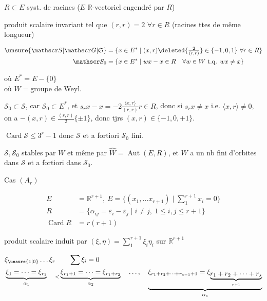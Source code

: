 
$R\subset E$ syst. de racines ($E$ $\mathbb R$-vectoriel engendré par $R$)

produit scalaire invariant tel que $(r,r)=2$ $\forall r\in R$ (racines ttes de même longueur)

\[
\begin{aligned}
\unsure{\mathscr S|\mathscr G|\mathfrak S}&=\{x\in E^*\mid (x,r)\deleted{\tfrac{2}{(r,r)}}\in\{-1,0,1\}\ \forall r\in R\}\\
\mathscr S_0&=\{x\in E^*\mid wx-x\in R\quad\forall w\in W\ \text{t.q. }wx\ne x\}
\end{aligned}
\]

où $E^*=E-\{0\}$\\ où $W={}$groupe de Weyl.

$\mathscr S_0\subset\mathscr S$, car $\mathscr S_0\subset E^*$, et  $s_rx-x=-2\frac{\langle x,r\rangle}{(r,r)}r\in R$, donc si $s_rx\ne x$ i.e. $\langle x,r\rangle\ne0$, on a $-(x,r)\in\frac{(r,r)}2\{\pm1\}$, donc  tjrs  $(x,r)\in\{-1,0,+1\}$.


$\operatorname{Card}\mathscr S\leq3^r-1$ donc $\mathscr S$ et a fortiori $\mathscr S_0$ fini.

$\mathscr S,\mathscr S_0$ stables par $W$ et même par $\widehat W=\operatorname{Aut}(E,R)$, et $W$ a un nb fini d’orbites dans $\mathscr S$ et a fortiori dans $\mathscr S_0$.

Cas $(A_r)$

\[
\begin{aligned}
E&=\mathbb R^{r+1},\ E=\{(x_1,\ldots x_{r+1})\mid\sum_1^{r+1}x_i=0\}\\
R&=\{\alpha_{ij}=\varepsilon_i-\varepsilon_j\mid i\ne j,\ 1\leq i,j\leq r+1\}\\
\operatorname{Card} R&=r(r+1)
\end{aligned}
\]

produit scalaire induit par $(\xi,\eta)=\sum_1^{r+1}\xi_i\eta_i$ sur $\mathbb R^{r+1}$ 

\[
\begin{aligned}
&\xi_{\unsure{1|0}}\ldots\xi_r\qquad\sum\xi_i=0\\
&\underbrace{\xi_{1}=\cdots=\xi_{r_1}}_{\alpha_1}\quad
\underset{<}{\phantom{a}}\underbrace{\xi_{r_1+1}=\cdots=\xi_{r_1+r_2}}_{\alpha_2}
\quad\ldots,\quad
\underbrace{\xi_{r_1+r_2+\cdots+r_{s-1}+1}=\xi_{\underbrace{r_1+r_2+\cdots+r_s}_{r+1}}}_{\alpha_s}
\end{aligned}
\]

